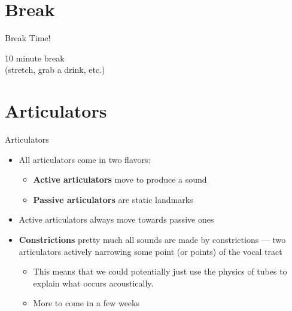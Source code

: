 \documentclass[professionalfonts]{beamer}
\begin{document}
\section*{Break}

\begin{frame}{Break Time!}
    \begin{center}
        \Huge 10 minute break \\ (stretch, grab a drink, etc.)
    \end{center}
\end{frame}

\section*{Articulators}

\begin{frame}{Articulators}
    \begin{itemize}
        \item All articulators come in two flavors: 
        \begin{itemize}
            \item \textbf{Active articulators} move to produce a sound
            \item \textbf{Passive articulators} are static landmarks
        \end{itemize}
        \item Active articulators always move towards passive ones
        \item \textbf{Constrictions} pretty much all sounds are made by constrictions — two articulators actively narrowing some point (or points) of the vocal tract
        \begin{itemize}
            \item This means that we could potentially just use the physics of tubes to explain what occurs acoustically. 
            \item More to come in a few weeks
        \end{itemize}
    \end{itemize}
\end{frame}
\end{document}
